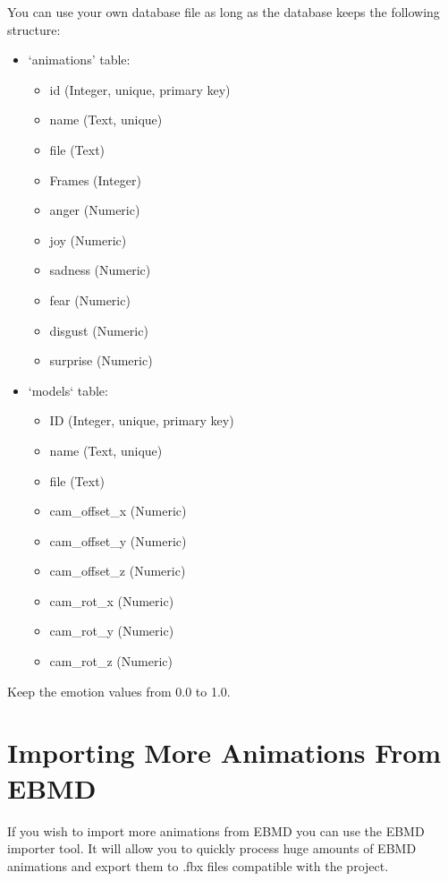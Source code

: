 \noindent You can use your own database file as long as the database keeps the following structure:
\begin{itemize}
	\item `animations' table:
	
	\begin{itemize}
		\item id (Integer, unique, primary key)
		\item name (Text, unique)
		\item file (Text)
		\item Frames (Integer)
		\item anger (Numeric)
		\item joy (Numeric)
		\item sadness (Numeric)
		\item fear (Numeric)
		\item disgust (Numeric)
		\item surprise (Numeric)
	\end{itemize}

	\item `models` table:
	
	\begin{itemize}
		\item ID (Integer, unique, primary key)
		\item name (Text, unique)
		\item file (Text)
		\item cam\_offset\_x (Numeric)
		\item cam\_offset\_y (Numeric)
		\item cam\_offset\_z (Numeric)
		\item cam\_rot\_x (Numeric)
		\item cam\_rot\_y (Numeric)
		\item cam\_rot\_z (Numeric)
	\end{itemize}
\end{itemize}

\noindent Keep the emotion values from 0.0 to 1.0.


\section{Importing More Animations From EBMD}
If you wish to import more animations from EBMD you can use the EBMD importer tool. It will allow you to quickly process huge amounts of EBMD animations and export them to .fbx files compatible with the project.

